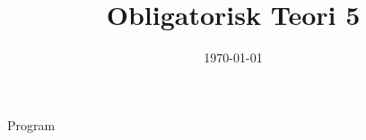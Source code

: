 \documentclass[11pt,aspectratio=169]{beamer}
\title{Obligatorisk Teori 5}
\date{\today}
\begin{document}
\begin{frame}
  \titlepage
\end{frame}

\begin{frame}{Program}
  \tableofcontents
\end{frame}
















\end{document}
